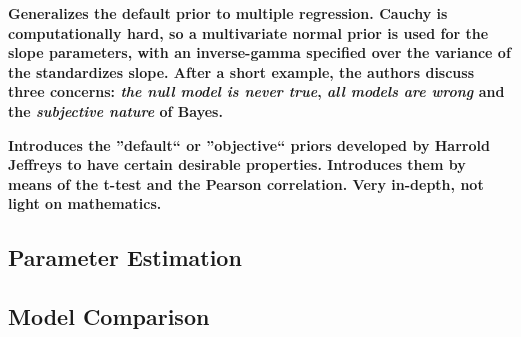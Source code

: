 \documentclass[12pt]{scrartcl}
\begin{document}
\begin{description}
  \textbf{Generalizes the default prior to multiple regression. Cauchy is computationally hard, so a multivariate normal prior is used for the slope parameters, with an inverse-gamma specified over the variance of the standardizes slope. After a short example, the authors discuss three concerns: \emph{the null model is never true}, \emph{all models are wrong} and the \emph{subjective nature} of Bayes.}
  
  \item {}
  
  \item {}
  
  \item {}
  
  \textbf{Introduces the ''default`` or ''objective`` priors developed by Harrold Jeffreys to have certain desirable properties. Introduces them by means of the t-test and the Pearson correlation. Very in-depth, not light on mathematics.}
\end{description}


\subsection{Parameter Estimation}
\begin{description}
  \item {}
  
  \item {}
\end{description}


\subsection{Model Comparison}
\begin{description}
  \item {}
\end{description}
\end{document}
